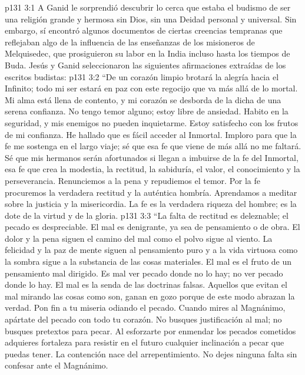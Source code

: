 \vs p131 3:1 A Ganid le sorprendió descubrir lo cerca que estaba el budismo de ser una religión grande y hermosa sin Dios, sin una Deidad personal y universal. Sin embargo, sí encontró algunos documentos de ciertas creencias tempranas que reflejaban algo de la influencia de las enseñanzas de los misioneros de Melquisedec, que prosiguieron su labor en la India incluso hasta los tiempos de Buda. Jesús y Ganid seleccionaron las siguientes afirmaciones extraídas de los escritos budistas:
\vs p131 3:2 \pc “De un corazón limpio brotará la alegría hacia el Infinito; todo mi ser estará en paz con este regocijo que va más allá de lo mortal. Mi alma está llena de contento, y mi corazón se desborda de la dicha de una serena confianza. No tengo temor alguno; estoy libre de ansiedad. Habito en la seguridad, y mis enemigos no pueden inquietarme. Estoy satisfecho con los frutos de mi confianza. He hallado que es fácil acceder al Inmortal. Imploro para que la fe me sostenga en el largo viaje; sé que esa fe que viene de más allá no me faltará. Sé que mis hermanos serán afortunados si llegan a imbuirse de la fe del Inmortal, esa fe que crea la modestia, la rectitud, la sabiduría, el valor, el conocimiento y la perseverancia. Renunciemos a la pena y repudiemos el temor. Por la fe procuremos la verdadera rectitud y la auténtica hombría. Aprendamos a meditar sobre la justicia y la misericordia. La fe es la verdadera riqueza del hombre; es la dote de la virtud y de la gloria.
\vs p131 3:3 “La falta de rectitud es deleznable; el pecado es despreciable. El mal es denigrante, ya sea de pensamiento o de obra. El dolor y la pena siguen el camino del mal como el polvo sigue al viento. La felicidad y la paz de mente siguen al pensamiento puro y a la vida virtuosa como la sombra sigue a la substancia de las cosas materiales. El mal es el fruto de un pensamiento mal dirigido. Es mal ver pecado donde no lo hay; no ver pecado donde lo hay. El mal es la senda de las doctrinas falsas. Aquellos que evitan el mal mirando las cosas como son, ganan en gozo porque de este modo abrazan la verdad. Pon fin a tu miseria odiando el pecado. Cuando mires al Magnánimo, apártate del pecado con todo tu corazón. No busques justificación al mal; no busques pretextos para pecar. Al esforzarte por enmendar los pecados cometidos adquieres fortaleza para resistir en el futuro cualquier inclinación a pecar que puedas tener. La contención nace del arrepentimiento. No dejes ninguna falta sin confesar ante el Magnánimo.
